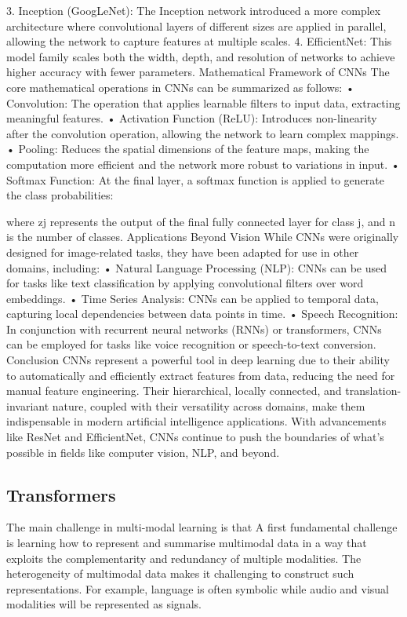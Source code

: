     3. Inception (GoogLeNet): The Inception network introduced a more complex architecture where convolutional layers of different sizes are applied in parallel, allowing the network to capture features at multiple scales.
    4. EfficientNet: This model family scales both the width, depth, and resolution of networks to achieve higher accuracy with fewer parameters.
Mathematical Framework of CNNs
The core mathematical operations in CNNs can be summarized as follows:
    • Convolution: The operation that applies learnable filters to input data, extracting meaningful features.
    • Activation Function (ReLU): Introduces non-linearity after the convolution operation, allowing the network to learn complex mappings.
    • Pooling: Reduces the spatial dimensions of the feature maps, making the computation more efficient and the network more robust to variations in input.
    • Softmax Function: At the final layer, a softmax function is applied to generate the class probabilities:

      where zj represents the output of the final fully connected layer for class j, and n is the number of classes.
Applications Beyond Vision
While CNNs were originally designed for image-related tasks, they have been adapted for use in other domains, including:
    • Natural Language Processing (NLP): CNNs can be used for tasks like text classification by applying convolutional filters over word embeddings.
    • Time Series Analysis: CNNs can be applied to temporal data, capturing local dependencies between data points in time.
    • Speech Recognition: In conjunction with recurrent neural networks (RNNs) or transformers, CNNs can be employed for tasks like voice recognition or speech-to-text conversion.
Conclusion
CNNs represent a powerful tool in deep learning due to their ability to automatically and efficiently extract features from data, reducing the need for manual feature engineering. Their hierarchical, locally connected, and translation-invariant nature, coupled with their versatility across domains, make them indispensable in modern artificial intelligence applications. With advancements like ResNet and EfficientNet, CNNs continue to push the boundaries of what's possible in fields like computer vision, NLP, and beyond.


\subsection{Transformers}
The main challenge in multi-modal learning is that A first fundamental challenge is learning how to
represent and summarise multimodal data in a way that exploits the
complementarity and redundancy of multiple modalities.
The heterogeneity of multimodal data makes it challenging to construct
such representations. For example, language is often symbolic while audio
and visual modalities will be represented as signals.

